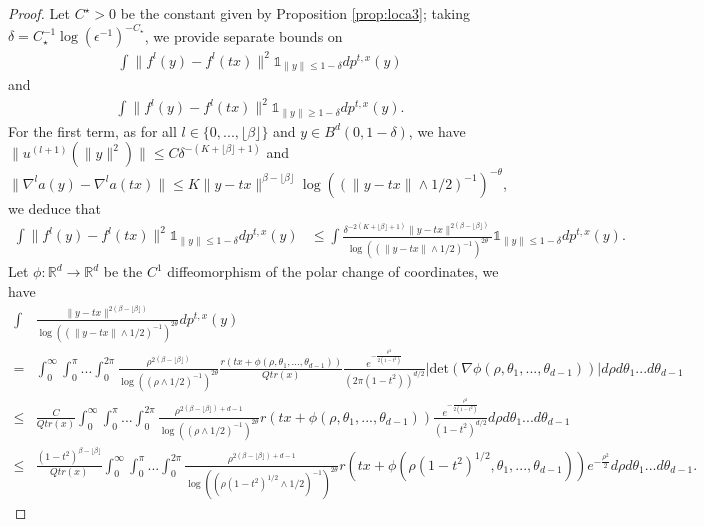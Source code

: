 \documentclass[10pt,a4paper]{amsart}
\begin{document}
\begin{proof}Let $C^\star>0$ be the constant given by Proposition \ref{prop:loca3};
taking $\delta=C_\star^{-1}\log(\epsilon^{-1})^{-C_\star}$, we provide separate bounds on 
    \begin{align*}
     \int \|f^l(y)-f^l(tx)\|^2\mathds{1}_{\|y\|\leq 1-\delta}dp^{t,x}(y)        
\end{align*}   
and
\begin{align*}  
     \int \|f^l(y)-f^l(tx)\|^2\mathds{1}_{\|y\|\geq 1-\delta}dp^{t,x}(y).
\end{align*}
For the first term,  as for all $l\in \{0,...,\lfloor \beta\rfloor\}$ and $y\in B^d(0,1-\delta)$, we have $\|u^{(l+1)}(\|y\|^2)\|\leq C \delta^{-(K+\lfloor \beta \rfloor+1)}$ and $\|\nabla^la(y)-\nabla^la(tx)\|\leq K\|y-tx\|^{\beta-\lfloor \beta \rfloor }\log((\|y-tx\|\wedge 1/2)^{-1})^{-\theta}$, we deduce that
\begin{align*}
    \int \|f^l(y)-f^l(tx)\|^2\mathds{1}_{\|y\|\leq 1-\delta}dp^{t,x}(y) & \leq \int \frac{\delta^{-2(K+\lfloor \beta \rfloor+1)}\|y-tx\|^{2(\beta-\lfloor \beta \rfloor )}}{\log((\|y-tx\|\wedge 1/2)^{-1})^{2\theta}}\mathds{1}_{\|y\|\leq 1-\delta}dp^{t,x}(y).
\end{align*}
Let $\phi:\mathbb{R}^d\rightarrow \mathbb{R}^d$ be the $C^1$ diffeomorphism of the polar change of coordinates, we have 
\begin{align*}
    \int&\frac{\|y-tx\|^{2(\beta-\lfloor \beta \rfloor )}}{\log((\|y-tx\|\wedge 1/2)^{-1})^{2\theta}}dp^{t,x}(y)\\
     = &\int_0^\infty\int_0^\pi... \int_0^{2\pi} \frac{\rho^{2(\beta-\lfloor \beta \rfloor) }}{\log((\rho\wedge 1/2)^{-1})^{2\theta}}\frac{r(tx +\phi(\rho,\theta_1,...,\theta_{d-1}))}{Qtr(x)} \frac{e^{-\frac{\rho^2}{2(1-t^2)}}}{(2\pi(1-t^2))^{d/2}}|\text{det}(\nabla \phi(\rho,\theta_1,...,\theta_{d-1}))|d\rho d\theta_1...d\theta_{d-1}\\
    \leq & \frac{C}{Qtr(x)}\int_0^{\infty}\int_0^\pi... \int_0^{2\pi} \frac{\rho^{2(\beta-\lfloor \beta \rfloor) +d-1 }}{\log((\rho\wedge 1/2)^{-1})^{2\theta}}r(tx +\phi(\rho,\theta_1,...,\theta_{d-1}))\frac{e^{-\frac{\rho^2}{2(1-t^2)}}}{(1-t^2)^{d/2}}d\rho d\theta_1...d\theta_{d-1}\\
    \leq & \frac{(1-t^2)^{\beta-\lfloor \beta \rfloor}}{Qtr(x)}\int_0^{\infty}\int_0^\pi... \int_0^{2\pi} \frac{\rho^{2(\beta-\lfloor \beta \rfloor) +d-1 }}{\log((\rho(1-t^2)^{1/2}\wedge 1/2)^{-1})^{2\theta}}r(tx +\phi(\rho(1-t^2)^{1/2},\theta_1,...,\theta_{d-1}))e^{-\frac{\rho^2}{2}}d\rho d\theta_1...d\theta_{d-1}.

\end{align*}
\end{proof}
\end{document}
